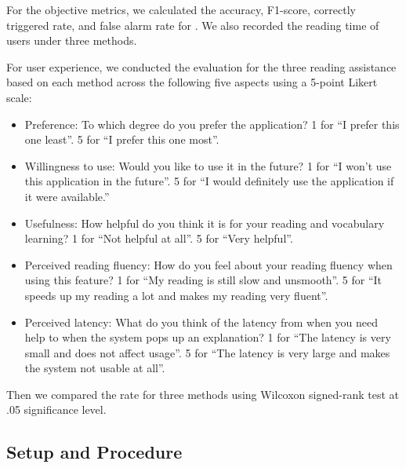 For the objective metrics, we calculated the accuracy, F1-score, correctly triggered rate, and false alarm rate for \name{}. We also recorded the reading time of users under three methods.

For user experience, we conducted the evaluation for the three reading assistance based on each method across the following five aspects using a 5-point Likert scale:
\begin{itemize}
    \item Preference: To which degree do you prefer the application? 1 for ``I prefer this one least''. 5 for ``I prefer this one most''.
    \item Willingness to use: Would you like to use it in the future? 1 for ``I won't use this application in the future''. 5 for ``I would definitely use the application if it were available.'' 
    \item Usefulness: How helpful do you think it is for your reading and vocabulary learning? 1 for ``Not helpful at all''. 5 for ``Very helpful''.
    \item Perceived reading fluency: How do you feel about your reading fluency when using this feature? 1 for ``My reading is still slow and unsmooth''. 5 for ``It speeds up my reading a lot and makes my reading very fluent''.
    \item Perceived latency: What do you think of the latency from when you need help to when the system pops up an explanation? 1 for ``The latency is very small and does not affect usage''. 5 for ``The latency is very large and makes the system not usable at all''.
\end{itemize}
Then we compared the rate for three methods using Wilcoxon signed-rank test at .05 significance level.
    
\subsection{Setup and Procedure}
\label{sec:eval_setup}
